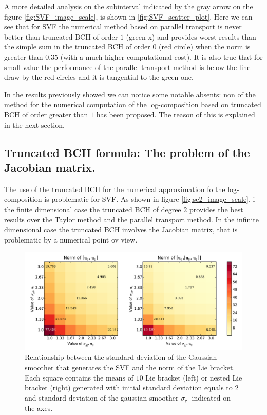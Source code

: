 A more detailed analysis on the subinterval indicated by the gray arrow on the figure \ref{fig:SVF_image_scale}, is shown in \ref{fig:SVF_scatter_plot}.
Here we can see that for SVF the numerical method based on parallel transport is never better than  truncated BCH of order $1$ (green x) and provides worst results than the simple sum in the truncated BCH of order $0$ (red circle) when the norm is greater than $0.35$ (with a much higher computational cost). It is also true that for small value the performance of the parallel transport method is below the line draw by the red circles and it is tangential to the green one.

In the results previously showed we can notice some notable absents: non of the method for the numerical computation of the log-composition based on truncated BCH of order greater than $1$ has been proposed. The reason of this is explained in the next section.


\subsection{Truncated BCH formula: The problem of the Jacobian matrix.}

The use of the truncated BCH for the numerical approximation fo the log-composition is problematic for SVF. As shown in figure \ref{fig:se2_image_scale}, i the finite dimensional case the truncated BCH of degree $2$ provides the best results over the Taylor method and the parallel transport method. In the infinite dimensional case the truncated BCH involves the Jacobian matrix, that is problematic by a numerical point ov view.

\begin{figure}[!ht]
	\hspace{0cm}
	\includegraphics[scale=0.5]{figures/SVF_image_scale_bracket_versus_gaussian.pdf}
	\caption{Relationship between the standard deviation of the Gaussian smoother that generates the SVF and the norm of the Lie bracket. Each square contains the means of $10$ Lie bracket (left) or nested Lie bracket (right) generated with initial standard deviation equals to $2$ and standard deviation of the gaussian smoother $\sigma_{\text{gf}}$ indicated on the axes.}
	\label{fig:SVF_image_scale_bracket_versus_gaussian}
\end{figure}

